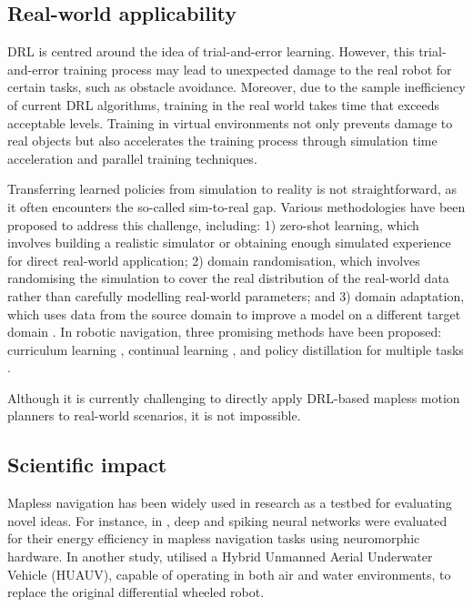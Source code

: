 \subsection{Real-world applicability}

DRL is centred around the idea of trial-and-error learning. However, this trial-and-error training process may lead to unexpected damage to the real robot for certain tasks, such as obstacle avoidance. Moreover, due to the sample inefficiency of current DRL algorithms, training in the real world takes time that exceeds acceptable levels. Training in virtual environments not only prevents damage to real objects but also accelerates the training process through simulation time acceleration and parallel training techniques.

Transferring learned policies from simulation to reality is not straightforward, as it often encounters the so-called sim-to-real gap. Various methodologies have been proposed to address this challenge, including: 1) zero-shot learning, which involves building a realistic simulator or obtaining enough simulated experience for direct real-world application; 2) domain randomisation, which involves randomising the simulation to cover the real distribution of the real-world data rather than carefully modelling real-world parameters; and 3) domain adaptation, which uses data from the source domain to improve a model on a different target domain \cite{ref:sim2real}. In robotic navigation, three promising methods have been proposed: curriculum learning \cite{ref:energy-efficient}, continual learning \cite{ref:sim2real}, and policy distillation for multiple tasks \cite{ref:sim2real}.

Although it is currently challenging to directly apply DRL-based mapless motion planners to real-world scenarios, it is not impossible.

\subsection{Scientific impact}

Mapless navigation has been widely used in research as a testbed for evaluating novel ideas. For instance, in \cite{ref:energy-efficient}, deep and spiking neural networks were evaluated for their energy efficiency in mapless navigation tasks using neuromorphic hardware. In another study, \cite{ref:huauv} utilised a Hybrid Unmanned Aerial Underwater Vehicle (HUAUV), capable of operating in both air and water environments, to replace the original differential wheeled robot.

